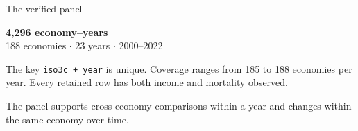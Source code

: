 \begin{frame}{The verified panel}
  \begin{center}
    {\LARGE\color{crimson}\textbf{4,296 economy--years}}\\[0.6em]
    {\Large 188 economies \(\cdot\) 23 years \(\cdot\) 2000--2022}
  \end{center}

  \vspace{0.9em}
  The key \texttt{iso3c + year} is unique. Coverage ranges from 185 to 188
  economies per year. Every retained row has both income and mortality
  observed.

  \vfill
  The panel supports cross-economy comparisons within a year and changes
  within the same economy over time.
\end{frame}
